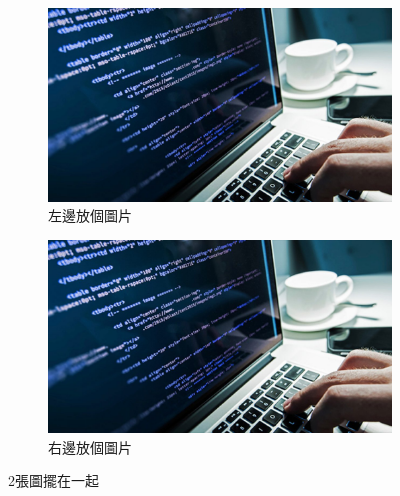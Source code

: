 \begin{figure}[hbpt]
    \centering
    \begin{subfigure}{0.45\linewidth}
        \includegraphics[width=\textwidth]{Figures/computer_science.jpg}
        \caption{左邊放個圖片}
    \end{subfigure}
    \hfill
    \begin{subfigure}{0.45\linewidth}
        \includegraphics[width=\textwidth]{Figures/computer_science.jpg}
        \caption{右邊放個圖片}
    \end{subfigure}
    \caption{2張圖擺在一起}
    \label{fig:figexample2}
\end{figure}

